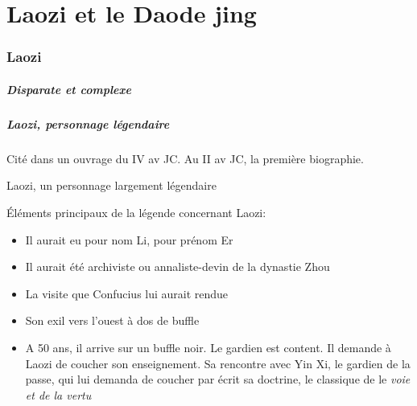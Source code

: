 \chapter{Laozi et le Daode jing}

\subsection{Laozi}
\paragraph{Disparate et complexe}

\paragraph{Laozi, personnage légendaire} Cité dans un ouvrage du IV av JC. Au II av JC, la première biographie. 



Laozi, un personnage largement légendaire


Éléments principaux de la légende concernant Laozi:
\begin{itemize}
    \item  	Il aurait eu pour nom Li, pour prénom Er
    \item 	Il aurait été archiviste ou annaliste-devin de la dynastie Zhou
    \item 	La visite que Confucius lui aurait rendue
    \item 	Son exil vers l’ouest à dos de buffle
    \item 	A 50 ans, il arrive sur un buffle noir. Le gardien est content. Il demande à Laozi de coucher son enseignement. Sa rencontre avec Yin Xi, le gardien de la passe, qui lui demanda de coucher par écrit sa doctrine, le classique de le \textit{voie et de la vertu}
\end{itemize}




